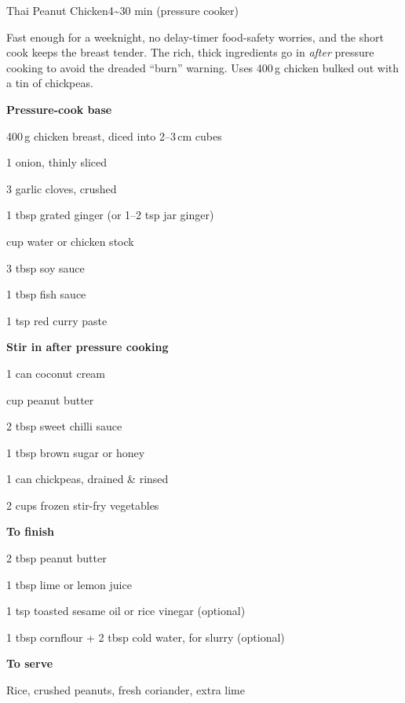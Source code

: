 

\begin{recipebox}{Thai Peanut Chicken}{4}{\textasciitilde30 min (pressure cooker)}

Fast enough for a weeknight, no delay-timer food-safety worries, and the short
cook keeps the breast tender. The rich, thick ingredients go in \emph{after}
pressure cooking to avoid the dreaded ``burn'' warning. Uses 400\,g chicken
bulked out with a tin of chickpeas.

\begin{ingredients}
  \item \textbf{Pressure-cook base}
  \item 400\,g chicken breast, diced into 2--3\,cm cubes
  \item 1 onion, thinly sliced
  \item 3 garlic cloves, crushed
  \item 1 tbsp grated ginger (or 1--2 tsp jar ginger)
  \item {} cup water or chicken stock
  \item 3 tbsp soy sauce
  \item 1 tbsp fish sauce
  \item 1 tsp red curry paste
  \item[] \textbf{Stir in after pressure cooking}
  \item 1 can coconut cream
  \item {} cup peanut butter
  \item 2 tbsp sweet chilli sauce
  \item 1 tbsp brown sugar or honey
  \item 1 can chickpeas, drained \& rinsed
  \item 2 cups frozen stir-fry vegetables
  \item[] \textbf{To finish}
  \item 2 tbsp peanut butter
  \item 1 tbsp lime or lemon juice
  \item 1 tsp toasted sesame oil or rice vinegar (optional)
  \item 1 tbsp cornflour + 2 tbsp cold water, for slurry (optional)
  \item[] \textbf{To serve}
  \item Rice, crushed peanuts, fresh coriander, extra lime
\end{ingredients}


\end{recipebox}
